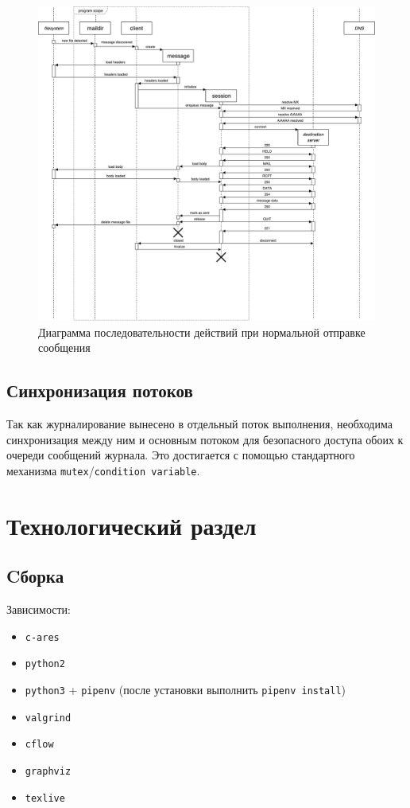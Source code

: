 \documentclass[a4paper,12pt]{report}
\begin{document}
\begin{figure}
\centering
\includegraphics[width=\textwidth]{report/activity.pdf}
\caption{Диаграмма последовательности действий при нормальной отправке
         сообщения}
\label{fig:activity}
\end{figure}

\section{Синхронизация потоков}

Так как журналирование вынесено в отдельный поток выполнения, необходима
синхронизация между ним и основным потоком для безопасного доступа обоих к
очереди сообщений журнала. Это достигается с помощью стандартного механизма
\texttt{mutex}/\texttt{condition variable}.

\chapter{Технологический раздел}

\section{Cборка}

Зависимости:
\begin{itemize}
\item \texttt{c-ares}
\item \texttt{python2}
\item \texttt{python3} + \texttt{pipenv} (после установки выполнить
      \texttt{pipenv install})
\item \texttt{valgrind}
\item \texttt{cflow}
\item \texttt{graphviz}
\item \texttt{texlive}
\end{itemize}
\end{document}
